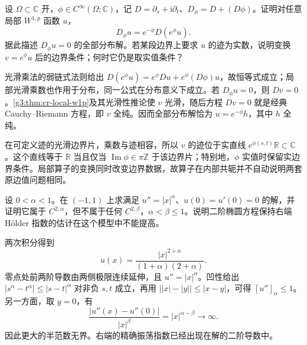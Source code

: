 \begin{exercise}\label{g3:ex:cr-scalar-gauge}
	设 \(\Omega\subset\mathbb C\) 开，\(\phi\in C^\infty(\Omega;\mathbb C)\)，记 \(D=\partial_s+\mathrm i\partial_t\)、\(D_\phi=D+(D\phi)\)。证明对任意局部 \(W^{1,p}\) 函数 \(u\)，
	\[
		D_\phi u=e^{-\phi}D(e^\phi u).
	\]
	据此描述 \(D_\phi u=0\) 的全部分布解。若某段边界上要求 \(u\) 的迹为实数，说明变换 \(v=e^\phi u\) 后的边界条件；何时它仍是取实值条件？
\end{exercise}
\begin{solution}
	光滑乘法的弱链式法则给出 \(D(e^\phi u)=e^\phi Du+e^\phi(D\phi)u\)，故恒等式成立；局部光滑乘数也作用于分布，同一公式在分布意义下成立。若 \(D_\phi u=0\)，则 \(Dv=0\)。\cref{g3:thm:cr-local-w1p}及其光滑性推论使 \(v\) 光滑，随后方程 \(Dv=0\) 就是经典 Cauchy--Riemann 方程，即 \(v\) 全纯。因而全部分布解恰为 \(u=e^{-\phi}h\)，其中 \(h\) 全纯。

	在可定义迹的光滑边界片，乘数与迹相容，所以 \(v\) 的迹位于实直线 \(e^{\phi(s,t)}\mathbb R\subset\mathbb C\)。这个直线等于 \(\mathbb R\) 当且仅当 \(\operatorname{Im}\phi\in\pi\mathbb Z\) 于该边界片；特别地，\(\phi\) 实值时保留实边界条件。局部算子的变换同时改变边界数据，故算子在内部共轭并不自动说明两套原边值问题相同。
\end{solution}

\begin{exercise}\label{g3:ex:schauder-holder-sharpness}
	设 \(0<\alpha<1\)。在 \((-1,1)\) 上求满足 \(u''=|x|^\alpha\)、\(u(0)=u'(0)=0\) 的解，并证明它属于 \(C^{2,\alpha}\)，但不属于任何 \(C^{2,\beta}\)，\(\alpha<\beta\le1\)。说明二阶椭圆方程保持右端 Hölder 指数的估计在这个模型中不能提高。
\end{exercise}
\begin{solution}
	两次积分得到
	\[
		u(x)=\frac{|x|^{2+\alpha}}{(1+\alpha)(2+\alpha)}.
	\]
	零点处前两阶导数由两侧极限连续延伸，且 \(u''=|x|^\alpha\)。凹性给出 \(|s^\alpha-t^\alpha|\le|s-t|^\alpha\) 对非负 \(s,t\) 成立，再用 \(\bigl||x|-|y|\bigr|\le|x-y|\)，可得 \([u'']_\alpha\le1\)。另一方面，取 \(y=0\)，有
	\[
		\frac{|u''(x)-u''(0)|}{|x|^\beta}=|x|^{\alpha-\beta}\longrightarrow\infty.
	\]
	因此更大的半范数无界。右端的精确振荡指数已经出现在解的二阶导数中。
\end{solution}

